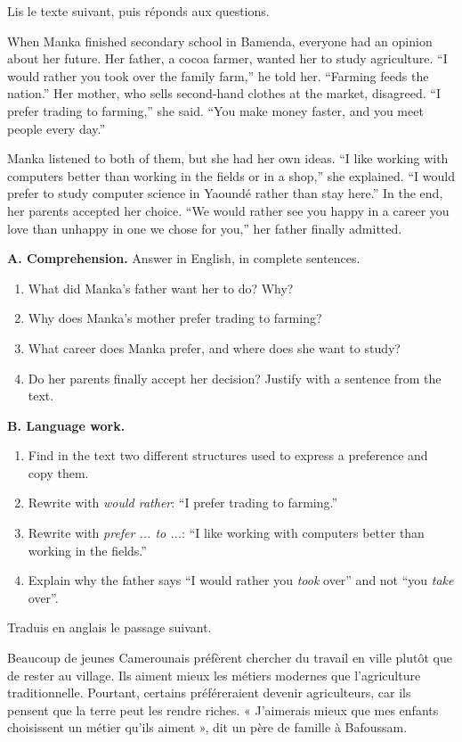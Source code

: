 \documentclass[11pt]{article}
\begin{document}
\begin{exercice}
Lis le texte suivant, puis réponds aux questions.
\begin{textebox}
When Manka finished secondary school in Bamenda, everyone had an opinion about her future. Her father, a cocoa farmer, wanted her to study agriculture. “I would rather you took over the family farm,” he told her. “Farming feeds the nation.” Her mother, who sells second-hand clothes at the market, disagreed. “I prefer trading to farming,” she said. “You make money faster, and you meet people every day.”

Manka listened to both of them, but she had her own ideas. “I like working with computers better than working in the fields or in a shop,” she explained. “I would prefer to study computer science in Yaoundé rather than stay here.” In the end, her parents accepted her choice. “We would rather see you happy in a career you love than unhappy in one we chose for you,” her father finally admitted.
\end{textebox}
\textbf{A. Comprehension.} Answer in English, in complete sentences.
\begin{enumerate}
\item What did Manka's father want her to do? Why?
\item Why does Manka's mother prefer trading to farming?
\item What career does Manka prefer, and where does she want to study?
\item Do her parents finally accept her decision? Justify with a sentence from the text.
\end{enumerate}
\textbf{B. Language work.}
\begin{enumerate}
\item Find in the text two different structures used to express a preference and copy them.
\item Rewrite with \emph{would rather}: “I prefer trading to farming.”
\item Rewrite with \emph{prefer ... to ...}: “I like working with computers better than working in the fields.”
\item Explain why the father says “I would rather you \emph{took} over” and not “you \emph{take} over”.
\end{enumerate}
\end{exercice}

\begin{exercice}
Traduis en anglais le passage suivant.
\begin{textebox}
Beaucoup de jeunes Camerounais préfèrent chercher du travail en ville plutôt que de rester au village. Ils aiment mieux les métiers modernes que l'agriculture traditionnelle. Pourtant, certains préféreraient devenir agriculteurs, car ils pensent que la terre peut les rendre riches. « J'aimerais mieux que mes enfants choisissent un métier qu'ils aiment », dit un père de famille à Bafoussam.
\end{textebox}
\end{exercice}
\end{document}
